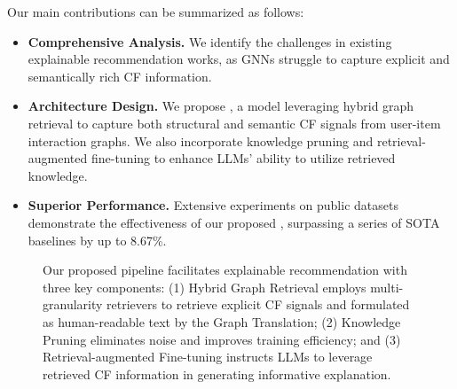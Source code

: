 
Our main contributions can be summarized as follows: 
\begin{itemize}[leftmargin=*]
    \item \textbf{Comprehensive Analysis.} We identify the challenges in existing explainable recommendation works, 
    as GNNs struggle to capture explicit and semantically rich CF information.
    \item \textbf{Architecture Design.} We propose \model, a model leveraging hybrid graph retrieval to capture both structural and semantic CF signals from user-item interaction graphs. We also incorporate knowledge pruning and retrieval-augmented fine-tuning to enhance LLMs' ability to utilize retrieved knowledge.
    \item \textbf{Superior Performance.} Extensive experiments on public datasets demonstrate the effectiveness of our proposed \model, surpassing a series of SOTA baselines by up to 8.67\%.
\end{itemize}

\begin{figure*}[t]
    \centering
    \vspace{-4mm}
    \caption{Our proposed pipeline \model facilitates explainable recommendation with three key components: (1) Hybrid Graph Retrieval employs multi-granularity retrievers to retrieve explicit CF signals and formulated as human-readable text by the Graph Translation; (2) Knowledge Pruning eliminates noise and improves training efficiency; and (3) Retrieval-augmented Fine-tuning instructs LLMs to leverage retrieved CF information in generating informative explanation. } 
    \label{fig:framework}
    \vspace{-3mm}
\end{figure*}
